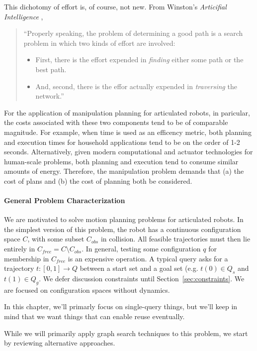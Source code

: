 \documentclass{report}
\begin{document}
This dichotomy of effort is, of course, not new.
From Winston's \emph{Articifial Intelligence} \cite{winston1977ai},
\begin{quote}
   ``Properly speaking, the problem of determining a good path is a search
   problem in which two kinds of effort are involved:
   \begin{itemize}
   \item First, there is the effort expended in \emph{finding} either
      some path or the best path.
   \item And, second, there is the effor actually expended in
      \emph{traversing} the network.''
   \end{itemize}
\end{quote}

For the application of manipulation planning for articulated robots,
in paricular,
the costs associated with these two components tend to be of comparable
magnitude.
For example,
when time is used as an efficency metric,
both planning and execution times for household applications
tend to be on the order of 1-2 seconds.
Alternatively, given
modern computational and actuator technologies for human-scale problems,
both planning and execution tend to consume similar amounts of energy.
Therefore,
the manipulation problem demands that
(a) the cost of plans and
(b) the cost of planning both be considered.

\paragraph{General Problem Characterization}

We are motivated to solve motion planning problems for articulated robots.
In the simplest version of this problem,
the robot has a continuous configuration space $C$,
with some subset $C_{obs}$ in collision.
All feasible trajectories must then lie entirely in
$C_{free} = C \setminus C_{obs}$.
In general, testing some configuration $q$ for membership in $C_{free}$
is an expensive operation.
A typical query asks for a trajectory $t: [0,1] \rightarrow Q$ between
a start set and a goal set (e.g. $t(0) \in Q_s$ and $t(1) \in Q_g$.
We defer discussion constraints until Section~\ref{sec:constraints}.
We are focused on configuration spaces without dynamics.

In this chapter,
we'll primarly focus on single-query things,
but we'll keep in mind that we want things that can enable reuse eventually.

While we will primarily apply graph search techniques to this problem,
we start by reviewing alternative approaches.
\end{document}
